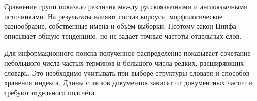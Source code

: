 \documentclass[12pt,a4paper]{article}
\begin{document}
Сравнение групп показало различия между русскоязычными и англоязычными
источниками.
На результаты влияют состав корпуса, морфологическое разнообразие,
собственные имена и объём выборки. Поэтому закон Ципфа описывает
общую тенденцию, но не задаёт точные частоты отдельных слов.

Для информационного поиска полученное распределение показывает
сочетание небольшого числа частых терминов и большого числа редких,
расширяющих словарь. Это необходимо учитывать при выборе структуры
словаря и способов хранения индекса. Длины списков документов зависят
от документных частот и требуют отдельного подсчёта.
\end{document}
